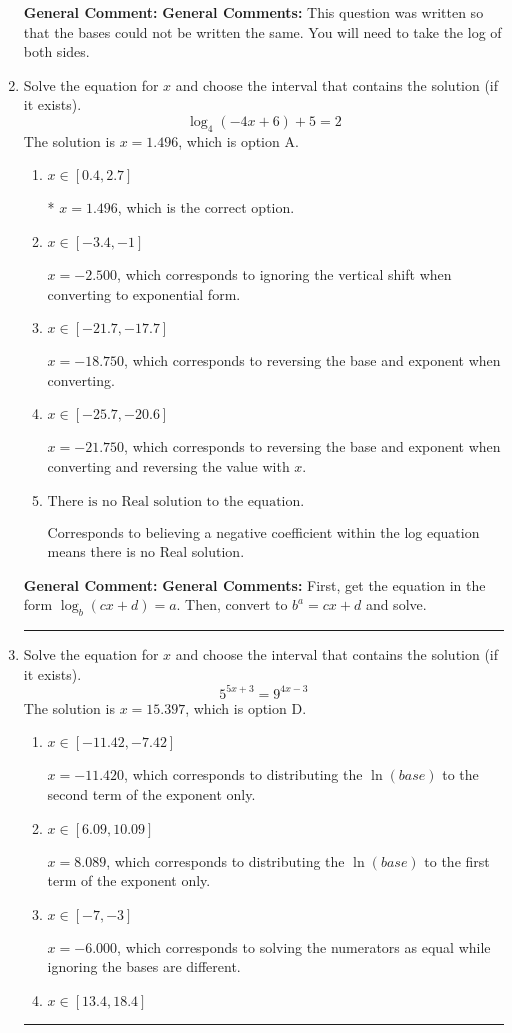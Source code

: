 \documentclass{extbook}[14pt]
\newcommand{\litem}[1]{\item #1

\rule{\textwidth}{0.4pt}}
\begin{document}
\begin{enumerate}
{\textbf{General Comment:} \textbf{General Comments:} This question was written so that the bases could not be written the same. You will need to take the log of both sides.
}
\litem{
Solve the equation for $x$ and choose the interval that contains the solution (if it exists).
\[ \log_{4}{(-4x+6)}+5 = 2 \]The solution is \( x = 1.496 \), which is option A.\begin{enumerate}[label=\Alph*.]
\item \( x \in [0.4, 2.7] \)

* $x = 1.496$, which is the correct option.
\item \( x \in [-3.4, -1] \)

$x = -2.500$, which corresponds to ignoring the vertical shift when converting to exponential form.
\item \( x \in [-21.7, -17.7] \)

$x = -18.750$, which corresponds to reversing the base and exponent when converting.
\item \( x \in [-25.7, -20.6] \)

$x = -21.750$, which corresponds to reversing the base and exponent when converting and reversing the value with $x$.
\item \( \text{There is no Real solution to the equation.} \)

Corresponds to believing a negative coefficient within the log equation means there is no Real solution.
\end{enumerate}

\textbf{General Comment:} \textbf{General Comments:} First, get the equation in the form $\log_b{(cx+d)} = a$. Then, convert to $b^a = cx+d$ and solve.
}
\litem{
Solve the equation for $x$ and choose the interval that contains the solution (if it exists).
\[ 5^{5x+3} = 9^{4x-3} \]The solution is \( x = 15.397 \), which is option D.\begin{enumerate}[label=\Alph*.]
\item \( x \in [-11.42, -7.42] \)

$x = -11.420$, which corresponds to distributing the $\ln(base)$ to the second term of the exponent only.
\item \( x \in [6.09, 10.09] \)

$x = 8.089$, which corresponds to distributing the $\ln(base)$ to the first term of the exponent only.
\item \( x \in [-7, -3] \)

$x = -6.000$, which corresponds to solving the numerators as equal while ignoring the bases are different.
\item \( x \in [13.4, 18.4] \)


\end{enumerate}}
\end{enumerate}
\end{document}
